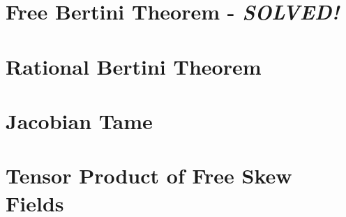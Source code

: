\documentclass[oneside]{amsbook}
\numberwithin{equation}{section}
\begin{document}
\bigskip





\section{Free Bertini Theorem - \textit{SOLVED!}}
	\label{sec:FreeBertini}
	





\section{Rational Bertini Theorem}
	\label{sec:RatBertini}
	






\section{Jacobian Tame}
	\label{sec:Jac Tame}



\bigskip


\section{Tensor Product of Free Skew Fields}
	\label{sec:TPFSF}


\end{document}
